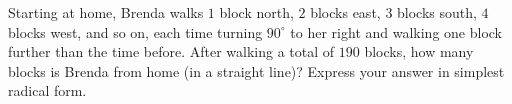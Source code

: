 Starting at home, Brenda walks $1$ block north, $2$ blocks east, $3$ blocks south, $4$ blocks west, and so on, each time turning $90^\circ$ to her right and walking one block further than the time before. After walking a total of $190$ blocks, how many blocks is Brenda from home (in a straight line)? Express your answer in simplest radical form.

